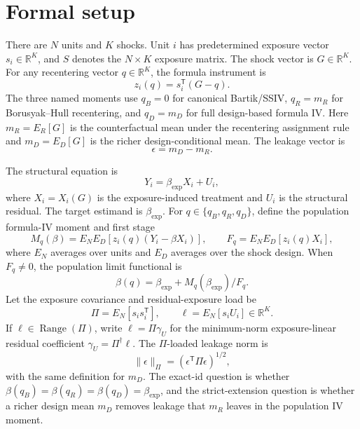 \documentclass[11pt]{article}
\newcommand{\transpose}{\mathsf{T}}
\newcommand{\R}{\mathbb{R}}
\theoremstyle{definition}
\theoremstyle{plain}
\theoremstyle{remark}
\begin{document}
\section{Formal setup}
There are \(N\) units and \(K\) shocks.  Unit \(i\) has predetermined exposure vector \(s_i\in\R^K\), and \(S\) denotes the \(N\times K\) exposure matrix.  The shock vector is \(G\in\R^K\).  For any recentering vector \(q\in\R^K\), the formula instrument is
\[
  z_i(q)=s_i^\transpose(G-q).
\]
The three named moments use \(q_B=0\) for canonical Bartik/SSIV, \(q_R=m_R\) for Borusyak--Hull recentering, and \(q_D=m_D\) for full design-based formula IV.  Here \(m_R=E_R[G]\) is the counterfactual mean under the recentering assignment rule and \(m_D=E_D[G]\) is the richer design-conditional mean.  The leakage vector is
\[
  \epsilon=m_D-m_R.
\]

The structural equation is
\[
  Y_i=\beta_{\exp}X_i+U_i,
\]
where \(X_i=X_i(G)\) is the exposure-induced treatment and \(U_i\) is the structural residual.  The target estimand is \(\beta_{\exp}\).  For \(q\in\{q_B,q_R,q_D\}\), define the population formula-IV moment and first stage
\[
  M_q(\beta)=E_N E_D[z_i(q)(Y_i-\beta X_i)],\qquad
  F_q=E_N E_D[z_i(q)X_i],
\]
where \(E_N\) averages over units and \(E_D\) averages over the shock design.  When \(F_q\ne0\), the population limit functional is
\[
  \beta(q)=\beta_{\exp}+M_q(\beta_{\exp})/F_q.
\]
Let the exposure covariance and residual-exposure load be
\[
  \Pi=E_N[s_i s_i^\transpose],\qquad
  \ell=E_N[s_iU_i]\in\R^K.
\]
If \(\ell\in\operatorname{Range}(\Pi)\), write \(\ell=\Pi\gamma_U\) for the minimum-norm exposure-linear residual coefficient \(\gamma_U=\Pi^\dagger\ell\).  The \(\Pi\)-loaded leakage norm is
\[
  \|\epsilon\|_{\Pi}=(\epsilon^\transpose\Pi\epsilon)^{1/2},
\]
with the same definition for \(m_D\).  The exact-id question is whether \(\beta(q_B)=\beta(q_R)=\beta(q_D)=\beta_{\exp}\), and the strict-extension question is whether a richer design mean \(m_D\) removes leakage that \(m_R\) leaves in the population IV moment.
\end{document}
